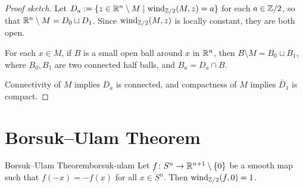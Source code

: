 \begin{proof}[Proof sketch]
    Let $D_a := \{z \in \mathbb{R}^n \setminus M \mid \operatorname{wind}_{\mathbb{Z}/2}(M, z) = a\}$ for each $a \in \mathbb{Z}/2$, so that $\mathbb{R}^n \setminus M = D_0 \sqcup D_1$. Since $\operatorname{wind}_{\mathbb{Z}/2}(M, z)$ is locally constant, they are both open.

    For each $x \in M$, if $B$ is a small open ball around $x$ in $\mathbb{R}^n$, then $B \setminus M = B_0 \sqcup B_1$, where $B_0, B_1$ are two connected half balls, and $B_a = D_a \cap B$.

    \begin{center}
    \end{center}

    Connectivity of $M$ implies $D_a$ is connected, and compactness of $M$ implies $\bar{D}_1$ is compact.
\end{proof}

\section{Borsuk--Ulam Theorem}

\begin{theorem}{Borsuk--Ulam Theorem}{borsuk-ulam}
    Let $f \colon S^n \to \mathbb{R}^{n+1} \setminus \{0\}$ be a smooth map such that $f(-x) = -f(x)$ for all $x \in S^n$. Then $\operatorname{wind}_{\mathbb{Z}/2}(f, 0) = 1$.
\end{theorem}

